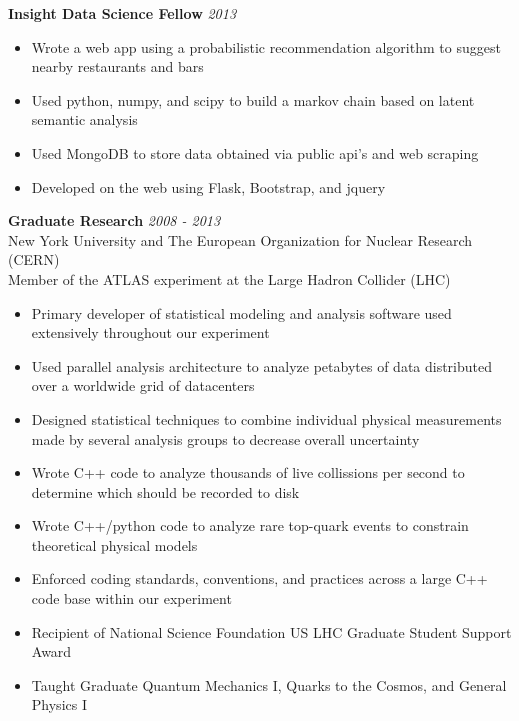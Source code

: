 \documentclass[9pt]{article}
\newenvironment{changemargin}[2]{%
  \begin{list}{}{%
    \setlength{\topsep}{0pt}%
    \setlength{\leftmargin}{#1}%
    \setlength{\rightmargin}{#2}%
    \setlength{\listparindent}{\parindent}%
    \setlength{\itemindent}{\parindent}%
    \setlength{\parsep}{\parskip}%
  }%
  \item[]}{\end{list}
}
\newenvironment{body} {
	\vspace*{-16pt}
	\begin{changemargin}{-0.25in}{-0.5in}
  }	
	{\end{changemargin}
}
\begin{document}
\begin{body}
	\vspace{14pt}
	\textbf{Insight Data Science Fellow} \hfill \emph{2013}\\
        \begin{itemize}
        \item Wrote a web app using a probabilistic recommendation algorithm to suggest nearby restaurants and bars \\
        \item Used python, numpy, and scipy to build a markov chain based on latent semantic analysis \\
        \item Used MongoDB to store data obtained via public api's and web scraping \\
        \item Developed on the web using Flask, Bootstrap, and jquery \\
        \end{itemize}

        \medskip

	\textbf{Graduate Research} \hfill \emph{2008 - 2013}\\
	New York University and The European Organization for Nuclear Research (CERN) \\
        Member of the ATLAS experiment at the Large Hadron Collider (LHC) \\

        \medskip

        \begin{itemize}
        \item Primary developer of statistical modeling and analysis software used extensively throughout our experiment
        \item Used parallel analysis architecture to analyze petabytes of data distributed over a worldwide grid of datacenters
        \item Designed statistical techniques to combine individual physical measurements made by several analysis groups to decrease overall uncertainty
        \item Wrote C++ code to analyze thousands of live collissions per second to determine which should be recorded to disk
        \item Wrote C++/python code to analyze rare top-quark events to constrain theoretical physical models
        \item Enforced coding standards, conventions, and practices across a large C++ code base within our experiment
        \item Recipient of National Science Foundation US LHC Graduate Student Support Award
        \item Taught Graduate Quantum Mechanics I, Quarks to the Cosmos, and General Physics I


\end{itemize}
\end{body}
\end{document}
